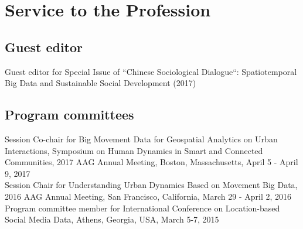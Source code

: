 \documentclass[11pt, a4paper]{article}
\begin{document}

\section*{Service to the Profession}
\subsection*{Guest editor}
Guest editor for Special Issue of ``Chinese Sociological Dialogue``: Spatiotemporal Big Data and Sustainable Social Development (2017)
\subsection*{Program committees}
Session Co-chair for Big Movement Data for Geospatial Analytics on Urban Interactions, Symposium on Human Dynamics in Smart and Connected Communities, 2017 AAG Annual Meeting, Boston, Massachusetts, April 5 - April 9, 2017\\
Session Chair for Understanding Urban Dynamics Based on Movement Big Data, 2016 AAG Annual Meeting, San Francisco, California, March 29 - April 2, 2016\\
Program committee member for International Conference on Location-based Social Media Data, Athens, Georgia, USA, March 5-7, 2015
\end{document}
